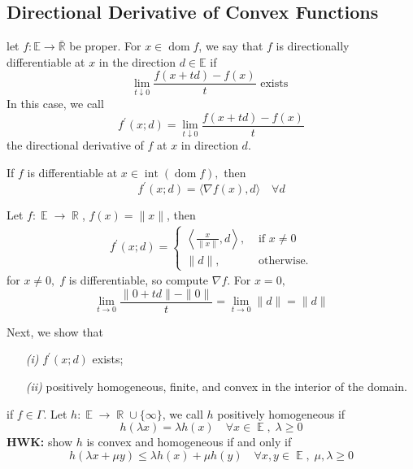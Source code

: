 \documentclass{tufte-handout}
\DeclareMathOperator{\dom}{dom}
\DeclareMathOperator{\R}{\mathbb{R}}
\DeclareMathOperator{\E}{\mathbb{E}}
\begin{document}
{{\subsection{Directional Derivative of Convex Functions}%
  \label{sub:Directional Derivative of Convex Functions}
 \begin{definition}
   let $f: \mathbb{E} \to \mathbb{\bar R}$ be proper. For $x \in \dom f $, we say that $f$ is directionally differentiable at $x$ in the direction $d \in \mathbb{E}$ if $$\lim_{t \downarrow 0} \frac{f(x+ td)- f(x)}{t} \text{ exists } $$ 
   In this case, we call $$f^\prime (x; d) = \lim_{t \downarrow 0} \frac{f(x+ td)- f(x)}{t} $$
   the directional derivative of $f$ at $x$ in direction $d.$ 
 \end{definition} 
 \begin{remark} 
   If $f$ is differentiable at $x \in \operatorname{int} (\dom f),$ then $$f^\prime (x;d) = \langle \nabla f(x) , d\rangle \quad \forall d $$ 
 \end{remark}
 \begin{example}[]
   Let $f : \E \to \R$, $f(x) = \| x\|$, then 
   \begin{equation*}
    \begin{split}
      f^\prime ( x; d ) =  
      \begin{cases}
        \left\langle \frac{x}{\|x\|},d \right\rangle, &\text{ if } x \neq 0\\
        \| d\| , &\text{ otherwise.}
      \end{cases}
    \end{split}
   \end{equation*}
   for $x \neq 0, \;f$ is differentiable, so compute $\nabla f$. For $x = 0, $
   $$\lim_{t \to 0} \frac{\|0 + td \| - \| 0\|}{t}  = \lim_{t \to 0} \| d\| = \| d\| $$
   \end{example}
 Next, we show that 
   \begin{enumerate}
     \item[\it (i)] $f^\prime (x; d)$ exists; 
     \item[\it (ii)] positively homogeneous, finite, and convex in the interior of the domain. 
   \end{enumerate}
   if $f \in \Gamma$. Let $h : \E \to \R \cup \{\infty\}$, we call $h$ positively homogeneous if $$h(\lambda x ) = \lambda h(x) \quad \forall x \in \E , \; \lambda \geq 0 $$
   \textbf{HWK:} show $h$ is convex and homogeneous if and only if 
   $$h( \lambda x +\mu y  ) \leq \lambda h(x) + \mu h(y)\quad \forall x,y \in \E, \; \mu, \lambda \geq 0 $$
}}
\end{document}
